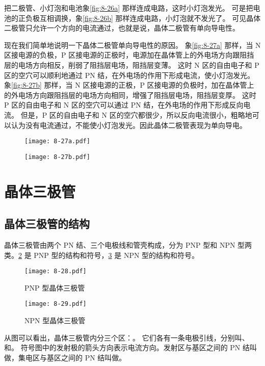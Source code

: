把二极管、小灯泡和电池象\cref{fig:8-26a} 那样连成电路，这时小灯泡发光。
可是把电池的正负极互相调换，象\cref{fig:8-26b} 那样连成电路，小灯泡就不发光了。
可见晶体二极管只允许一个方向的电流通过，也就是说，晶体二极管有单向导电性。

现在我们简单地说明一下晶体二极管单向导电性的原因。
象\cref{fig:8-27a} 那样，当 N 区接电源的负极，P 区接电源的正极时，电源加在晶体管上的外电场方向跟阻挡层的电场方向相反，削弱了阻挡层电场，阻挡层变薄。
这时 N 区的自由电子和 P 区的空穴可以顺利地通过 PN 结，在外电场的作用下形成电流，使小灯泡发光。
象\cref{fig:8-27b} 那样，当 N 区接电源的正极，P 区接电源的负极时，加在晶体管上的外电场方向跟阻挡层的电场方向相同，增强了阻挡层电场，阻挡层变厚。
这时 P 区的自由电子和 N 区的空穴可以通过 PN 结，在外电场的作用下形成反向电流。
但是，P 区的自由电子和 N 区的空穴都很少，所以反向电流很小，粗略地可以认为没有电流通过，不能使小灯泡发光。因此晶体二极管表现为单向导电。
\begin{figure}
  \begin{minipage}[b]{0.48\linewidth}\centering
    \texttt{[image: 8-27a.pdf]}
    \subcaption{}\label{fig:8-27a}
  \end{minipage}
  \begin{minipage}[b]{0.48\linewidth}\centering
    \texttt{[image: 8-27b.pdf]}
    \subcaption{}\label{fig:8-27b}
  \end{minipage}
  \caption{}\label{fig:8-27}
\end{figure}

\section{晶体三极管}
\subsection{晶体三极管的结构}
晶体三极管由两个 PN 结、三个电极线和管壳构成，分为 PNP 型和 NPN 型两类。\cref{fig:8-28} 是 PNP 型的结构和符号，\cref{fig:8-29} 是 NPN 型的结构和符号。
\begin{figure}
  \texttt{[image: 8-28.pdf]}
  \caption{PNP 型晶体三极管}\label{fig:8-28}
\end{figure}

\begin{figure}
  \texttt{[image: 8-29.pdf]}
  \caption{NPN 型晶体三极管}\label{fig:8-29}
\end{figure}

从图可以看出，晶体三极管内分三个区：。
它们各有一条电极引线，分别叫、 和。
符号图中的发射极的箭头方向表示电流方向。发射区与基区之间的 PN 结叫做，集电区与基区之间的 PN 结叫做。

